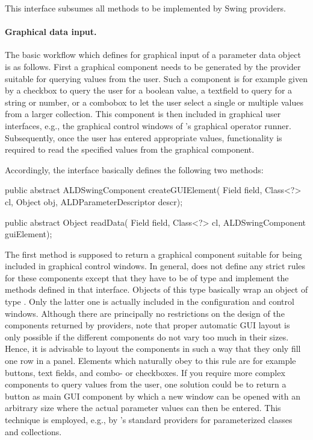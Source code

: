 \vspace*{-0.25cm}
This interface subsumes all methods to be implemented by Swing providers.

\paragraph{Graphical data input.} The basic workflow which
\alida defines for graphical input of a parameter data object is as follows. First a graphical 
component needs to be generated by the provider suitable for querying values 
from the user. Such a component is for example given by a checkbox to query the user for a boolean 
value, a textfield to query for a string or number, or a combobox to let the user select a single
or multiple values from a larger collection. This component is then included in graphical user
interfaces, e.g., the graphical control windows of \alida's graphical operator runner.
Subsequently, once the user has entered appropriate values, functionality is required 
to read the specified values from the graphical component. 

Accordingly, the interface basically defines the following two methods:
\vspace*{0.5cm}
\begin{code}
  public abstract ALDSwingComponent createGUIElement(
      Field field, Class<?> cl, Object obj, ALDParameterDescriptor descr);

  public abstract Object readData(
      Field field, Class<?> cl, ALDSwingComponent guiElement);
\end{code}

\vspace*{-0.25cm}
The first method is supposed to return a graphical component suitable for being included in 
graphical control windows. In general, \alida does not define any strict rules
for these components except that they have to be of type
 and implement the methods defined in that interface.
Objects of this type basically wrap an object of type . 
Only the latter one is actually included in the configuration and control windows. 
Although there are principally no restrictions on the 
design of the components returned by providers, note that proper automatic GUI
layout is only possible if the different 
components do not vary too much in their sizes. Hence, it is advisable to layout the components 
in such a way that they only fill one row in a panel. Elements which naturally obey to this rule 
are for example buttons, text fields, and combo- or checkboxes. If you require more complex 
components to query values from the user, one solution could be to return a button as main GUI
component by which a new window can be opened with an arbitrary size where the actual parameter 
values can then be entered. 
This technique is employed, e.g., by \alida's standard providers for
parameterized classes and collections.

